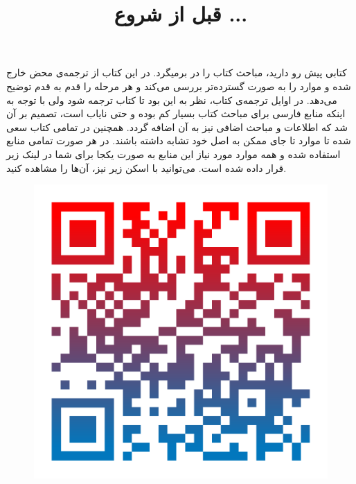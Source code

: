 \textbf{\vspace{80pt}}
\title{
    \BTitr
    \Huge
    \hspace{-40pt}
    \begin{flushright}
        قبل از شروع ...
    \end{flushright}
}
\textbf{\vspace{80pt}}

{
    \Large
    \begin{spacing}{1.5}
        کتابی پیش رو دارید، مباحث کتاب  را در برمیگرد.
        در این کتاب از ترجمه‌ی محض خارج شده و موارد را به صورت گسترده‌تر بررسی می‌کند و هر مرحله را قدم به قدم توضیح می‌دهد.
        در اوایل ترجمه‌ی کتاب، نظر به این بود تا کتاب ترجمه شود ولی با توجه به اینکه منابع فارسی برای مباحث کتاب بسیار کم بوده و حتی نایاب است، تصمیم بر آن شد که اطلاعات و مباحث اضافی نیز به آن اضافه گردد.
        همچنین در تمامی کتاب سعی شده تا موارد تا جای ممکن به اصل خود تشابه داشته باشند.
        در هر صورت تمامی منابع استفاده شده و همه موارد مورد نیاز این منابع به صورت یکجا برای شما در لینک زیر قرار داده شده است.
        می‌توانید با اسکن  زیر نیز، آن‌ها را مشاهده کنید.

        \begin{figure}[H]
            \centering
            \setlength{\belowcaptionskip}{-10pt}
            \includegraphics[scale=0.15]{Images/2/2.BeforeIntro.1.1.png}
            \caption*{\Large {}}
        \end{figure}


\end{spacing}}
